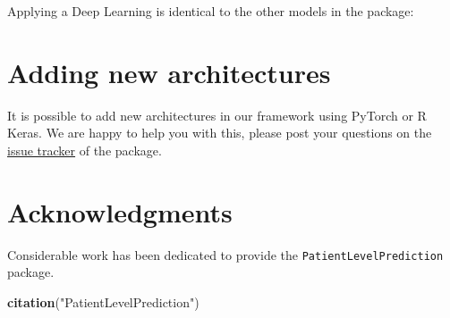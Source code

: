 \documentclass[]{article}
\newenvironment{Shaded}{\begin{snugshade}}{\end{snugshade}}
\newcommand{\KeywordTok}[1]{\textcolor[rgb]{0.13,0.29,0.53}{\textbf{#1}}}
\newcommand{\StringTok}[1]{\textcolor[rgb]{0.31,0.60,0.02}{#1}}
\newcommand{\CommentTok}[1]{\textcolor[rgb]{0.56,0.35,0.01}{\textit{#1}}}
\newcommand{\OperatorTok}[1]{\textcolor[rgb]{0.81,0.36,0.00}{\textbf{#1}}}
\newcommand{\NormalTok}[1]{#1}
\begin{document}
Applying a Deep Learning is identical to the other models in the
package:

\begin{Shaded}
\end{Shaded}

\section{Adding new architectures}\label{adding-new-architectures}

It is possible to add new architectures in our framework using PyTorch
or R Keras. We are happy to help you with this, please post your
questions on the
\href{www.github.com/OHDSI/PatientLevelPrediction/issues}{issue tracker}
of the package.

\section{Acknowledgments}\label{acknowledgments}

Considerable work has been dedicated to provide the
\texttt{PatientLevelPrediction} package.

\begin{Shaded}
\begin{Highlighting}[]
\KeywordTok{citation}\NormalTok{(}\StringTok{"PatientLevelPrediction"}\NormalTok{)}
\end{Highlighting}
\end{Shaded}
\end{document}
